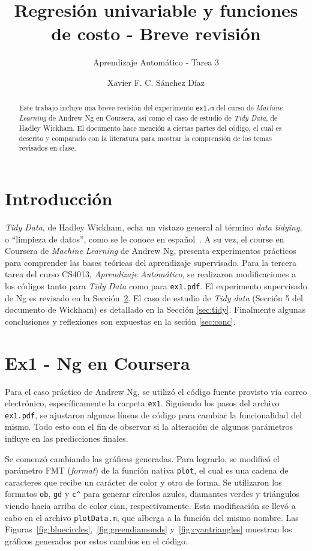 \documentclass{llncs}
\title{Regresión univariable y funciones de costo - Breve revisión}
\subtitle{Aprendizaje Automático - Tarea 3}
\author{Xavier F. C. Sánchez Díaz\inst{1}}
\institute{Tecnológico de Monterrey \\
\email{<A01170065@itesm.mx>}}
\begin{document}
\maketitle
\begin{abstract}
Este trabajo incluye una breve revisión del experimento \texttt{ex1.m} del curso de \textit{Machine Learning} de Andrew Ng en Coursera, así como el caso de estudio de \textit{Tidy Data}, de Hadley Wickham.
El documento hace mención a ciertas partes del código, el cual es descrito y comparado con la literatura para mostrar la comprensión de los temas revisados en clase.
\end{abstract}

\section{Introducción}
\label{sec:intro}

\textit{Tidy Data}, de Hadley Wickham, echa un vistazo general al término \textit{data tidying}, o ``limpieza de datos'', como se le conoce en español~\cite{JSSv059i10}.
A su vez,
el course en Coursera de \textit{Machine Learning} de Andrew Ng,
presenta experimentos prácticos para comprender las bases teóricas del aprendizaje supervisado.
Para la tercera tarea del curso CS4013, \textit{Aprendizaje Automático}, se realizaron modificaciones a los códigos tanto para \textit{Tidy Data} como para \texttt{ex1.pdf}.
El experimento supervisado de Ng es revisado en la Sección~\ref{sec:ex1}.
El caso de estudio de \textit{Tidy data} (Sección 5 del documento de Wickham) es detallado en la Sección \ref{sec:tidy}.
Finalmente algunas conclusiones y reflexiones son expuestas en la seción \ref{sec:conc}.

\section{Ex1 - Ng en Coursera} %
\label{sec:ex1}

Para el caso práctico de Andrew Ng, se utilizó el código fuente provisto via correo electrónico, específicamente la carpeta \texttt{ex1}.
Siguiendo los pasos del archivo \texttt{ex1.pdf},
se ajustaron algunas líneas de código para cambiar la funcionalidad del mismo.
Todo esto con el fin de observar si la alteración de algunos parámetros influye en las predicciones finales.

Se comenzó cambiando las gráficas generadas.
Para lograrlo, se modificó el parámetro FMT (\textit{format}) de la función nativa \texttt{plot},
el cual es una cadena de caracteres que recibe un carácter de color y otro de forma.
Se utilizaron los formatos \texttt{ob}, \texttt{gd} y \texttt{c\^} para generar círculos azules, diamantes verdes y triángulos viendo hacia arriba de color cian, respectivamente.
Esta modificación se llevó a cabo en el archivo \texttt{plotData.m}, que alberga a la función del mismo nombre.
Las Figuras~\ref{fig:bluecircles},~\ref{fig:greendiamonds} y~\ref{fig:cyantriangles} muestran los gráficos generados por estos cambios en el código.
\end{document}
